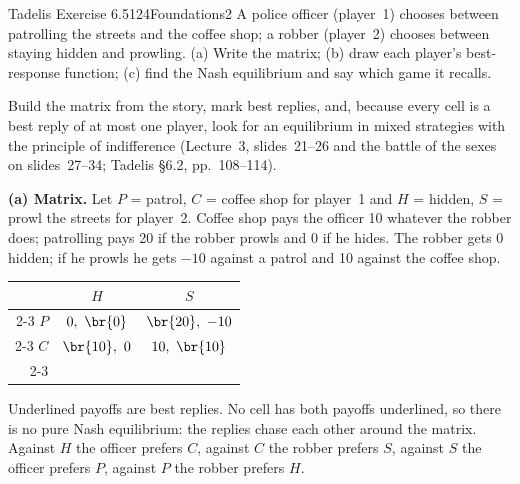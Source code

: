 \begin{exsol}{Tadelis Exercise 6.5}{124}{Foundations}{2}
\asked A police officer (player~1) chooses between patrolling the streets and the coffee shop; a
robber (player~2) chooses between staying hidden and prowling. (a) Write the matrix; (b) draw each
player's best-response function; (c) find the Nash equilibrium and say which game it recalls.

\method Build the matrix from the story, mark best replies, and, because every cell is a best reply of
at most one player, look for an equilibrium in mixed strategies with the principle of indifference
(Lecture~3, slides~21--26 and the battle of the sexes on slides~27--34; Tadelis \S6.2, pp.~108--114).

\solution
\textbf{(a) Matrix.} Let $P$ = patrol, $C$ = coffee shop for player~1 and $H$ = hidden, $S$ = prowl
the streets for player~2. Coffee shop pays the officer 10 whatever the robber does; patrolling pays
20 if the robber prowls and 0 if he hides. The robber gets 0 hidden; if he prowls he gets $-10$ against
a patrol and 10 against the coffee shop.
\begin{center}
\begin{tabular}{r|c|c|}
\multicolumn{1}{r}{} & \multicolumn{1}{c}{$H$} & \multicolumn{1}{c}{$S$}\\ \cline{2-3}
$P$ & $0,\ \br{0}$ & $\br{20},\ -10$ \\ \cline{2-3}
$C$ & $\br{10},\ 0$ & $10,\ \br{10}$ \\ \cline{2-3}
\end{tabular}
\end{center}
Underlined payoffs are best replies. No cell has both payoffs underlined, so there is no pure Nash
equilibrium: the replies chase each other around the matrix. Against
$H$ the officer prefers $C$, against $C$ the robber prefers $S$, against $S$ the officer prefers $P$,
against $P$ the robber prefers $H$.


\end{exsol}
